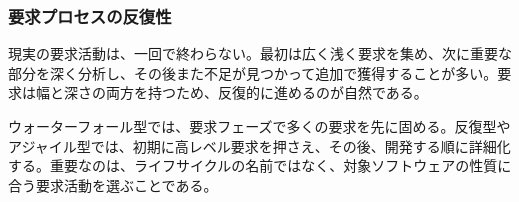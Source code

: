\subsubsection{要求プロセスの反復性}

現実の要求活動は、一回で終わらない。最初は広く浅く要求を集め、次に重要な部分を深く分析し、その後また不足が見つかって追加で獲得することが多い。要求は幅と深さの両方を持つため、反復的に進めるのが自然である。

ウォーターフォール型では、要求フェーズで多くの要求を先に固める。反復型やアジャイル型では、初期に高レベル要求を押さえ、その後、開発する順に詳細化する。重要なのは、ライフサイクルの名前ではなく、対象ソフトウェアの性質に合う要求活動を選ぶことである。
